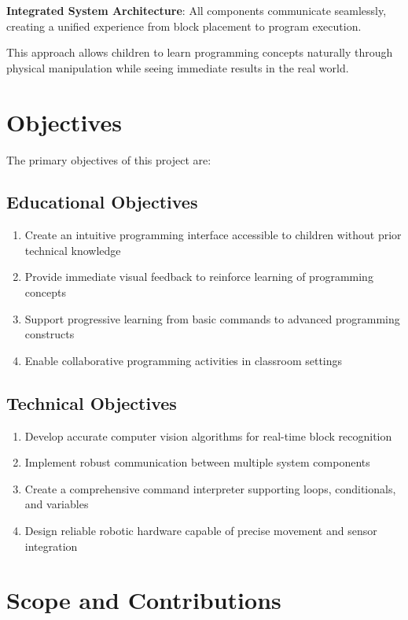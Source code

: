 \textbf{Integrated System Architecture}: All components communicate seamlessly, creating a unified experience from block placement to program execution.

This approach allows children to learn programming concepts naturally through physical manipulation while seeing immediate results in the real world.

\section{Objectives}

The primary objectives of this project are:

\subsection{Educational Objectives}
\begin{enumerate}
    \item Create an intuitive programming interface accessible to children without prior technical knowledge
    \item Provide immediate visual feedback to reinforce learning of programming concepts
    \item Support progressive learning from basic commands to advanced programming constructs
    \item Enable collaborative programming activities in classroom settings
\end{enumerate}

\subsection{Technical Objectives}
\begin{enumerate}
    \item Develop accurate computer vision algorithms for real-time block recognition
    \item Implement robust communication between multiple system components
    \item Create a comprehensive command interpreter supporting loops, conditionals, and variables
    \item Design reliable robotic hardware capable of precise movement and sensor integration
\end{enumerate}

\section{Scope and Contributions}


